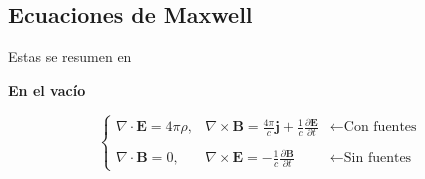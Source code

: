 \subsection{Ecuaciones de Maxwell}
Estas se resumen en
\begin{center}
\textbf{En el vacío}
\end{center}
\begin{equation*}
    \left\{
        \begin{matrix}
            \nabla \cdot \textbf{E} = 4\pi\rho,
            &
            \nabla \times \textbf{B} = 
            \frac{4\pi}{c}\textbf{j}
            + \frac{1}{c}\frac{\partial \textbf{E}}{\partial t}
            &
            \longleftarrow
            \mbox{Con fuentes}\\
            & & \\
            \nabla \cdot \textbf{B} = 0,
            &
            \nabla \times \textbf{E} =
            -\frac{1}{c}\frac{\partial \textbf{B}}{\partial t}
            &
            \longleftarrow \mbox{Sin fuentes}
        \end{matrix}
    \right.
\end{equation*}

